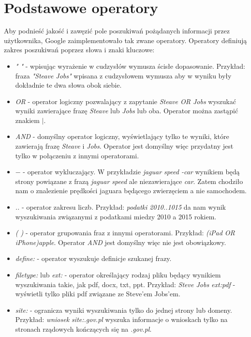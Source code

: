\documentclass[licencjacka]{pracadypl}
\theoremstyle{definition}
\begin{document}
\section{Podstawowe operatory}
Aby podnieść jakość i zawęzić pole poszukiwań pożądanych informacji przez użytkownika, Google zaimplementowało tak zwane operatory. 
Operatory definiują zakres poszukiwań poprzez słowa i znaki kluczowe:
\begin{itemize}
	\item \emph{" "} - wpisując wyrażenie w cudzysłów wymusza ścisłe dopasowanie. 
	Przykład: fraza \emph{"Steave Jobs"} wpisana z cudzysłowem wymusza aby w wyniku były dokładnie te dwa słowa obok siebie.
	
	\item \emph{OR} - operator logiczny pozwalający z zapytanie \emph{Steave OR Jobs} wyszukać wyniki zawierające frazę \emph{Steave} lub \emph{Jobs} lub oba.
	Operator można zastąpić znakiem $|$.
	
	\item \emph{AND} - domyślny operator logiczny, wyświetlający tylko te wyniki, które zawierają frazę \emph{Steave} i \emph{Jobs}. Operator jest domyślny więc przydatny jest tylko w połączeniu z innymi operatorami.
	
	\item $-$ - operator wykluczający. W przykładzie \emph{jaguar speed -car} wynikiem będą strony powiązane z frazą \emph{jaguar speed} ale niezawierające \emph{car}. Zatem chodziło nam o znalezienie prędkości jaguara będącego zwierzęciem a nie samochodem.
	
	\item \emph{..} - operator zakresu liczb. Przykład: \emph{podatki 2010..1015} da nam wynik wyszukiwania związanymi z podatkami miedzy 2010 a 2015 rokiem.
	
	\item \emph{( )} - operator grupowania fraz z innymi operatorami. 
	Przykład: \emph{(iPad OR iPhone)apple}. Operator \emph{AND} jest domyślny więc nie jest obowiązkowy.
	
	\item \emph{define:} - operator wyszukuje definicje szukanej frazy.
	
	\item \emph{filetype:} lub \emph{ext:} - operator określający rodzaj pliku będący wynikiem wyszukiwania takie, jak pdf, docx, txt, ppt.
	Przykład: \emph{Steve Jobs ext:pdf} - wyświetli tylko pliki pdf związane ze Steve'em Jobs'em. 
	
	\item \emph{site:} - ogranicza wyniki wyszukiwania tylko do jednej strony lub domeny.
	Przykład: \emph{wniosek site:.gov.pl} wyszuka informacje o wnioskach tylko na stronach rządowych kończących się na \emph{.gov.pl}.


\end{itemize}
\end{document}
